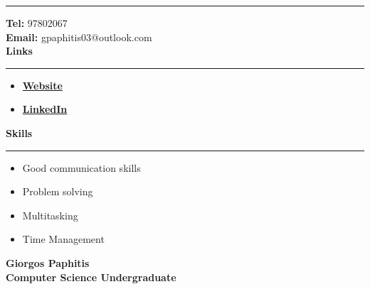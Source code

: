 \documentclass[12pt]{article}
\begin{document}
\begin{paracol}{2}
\begin{tcolorbox}[colback=mybgcolor, colframe=mybgcolor, boxrule=0pt, arc=0pt, outer arc=0pt, left=10pt, right=8pt, top=20pt, bottom=10pt,height=\textheight]
      \hrule
      \vspace{0.2cm}
      {\fontsize{10pt}{18pt}\selectfont
         \textbf{Tel:} 97802067\\
         \textbf{Email:} gpaphitis03@outlook.com\\
      }
      \vspace{1cm}
      {\fontsize{12pt}{18pt}\selectfont
         \textbf{{\large Links}}\\
         }
      \vspace{0.15cm}
      \hrule
      \vspace{0.2cm}
      {\fontsize{10pt}{13pt}\selectfont
      \begin{itemize}[leftmargin=15pt, itemsep=0pt, topsep=0pt]
         \item\href{https://giorgospaphitis.com}{\textbf{Website}}\\
         \item\href{https://www.linkedin.com/in/giorgos-paphitis-7307a825b/}{\textbf{LinkedIn}}\\
      \end{itemize}
      }
      \vspace{1cm}
      {\fontsize{12pt}{18pt}\selectfont
         \textbf{{\large Skills}}\\
         }
      \vspace{0.15cm}
      \hrule
      \vspace{0.2cm}
      {\fontsize{10pt}{13pt}\selectfont
      \begin{itemize}[leftmargin=15pt, itemsep=0pt, topsep=0pt]
         \item Good communication skills\\
         \item Problem solving\\
         \item Multitasking\\
         \item Time Management\\
      \end{itemize}
      }
   \end{tcolorbox}
   \switchcolumn
   \vspace*{1.5cm}
   \textbf{\Huge \textcolor{mybgcolor}{Giorgos Paphitis}}\\[0.5em]
   \textbf{Computer Science Undergraduate}\\
   \vspace{2em}
   \lipsum[2-4]
   
\end{paracol}
\end{document}
